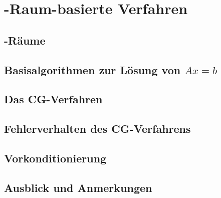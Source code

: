 \section{-Raum-basierte Verfahren}

\subsection{-Räume}

\subsection{Basisalgorithmen zur Lösung von $Ax=b$}

\subsection{Das CG-Verfahren}

\subsection{Fehlerverhalten des CG-Verfahrens}

\subsection{Vorkonditionierung}

\subsection{Ausblick und Anmerkungen}